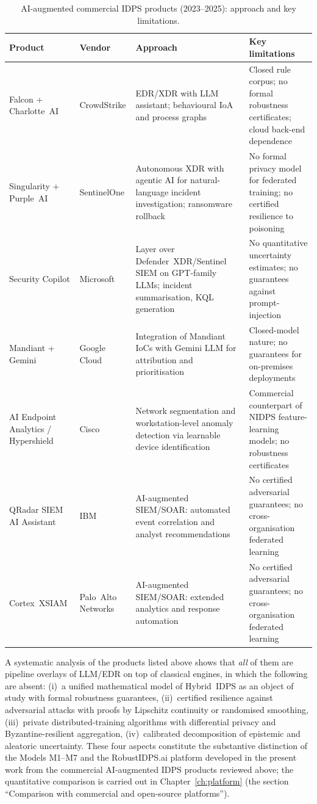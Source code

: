 \fi
\begin{table}[htbp]
\centering
\caption{AI-augmented commercial IDPS products (2023--2025): approach and key limitations.}
\label{tab:ai_idps_products}
\small
\setlength{\tabcolsep}{4pt}
\begin{tabular}{p{2.7cm} p{2.0cm} p{4.5cm} p{4.8cm}}
\toprule
\textbf{Product} & \textbf{Vendor} & \textbf{Approach} & \textbf{Key limitations} \\
\midrule
Falcon + Charlotte~AI & CrowdStrike & EDR/XDR with LLM assistant; behavioural IoA and process graphs & Closed rule corpus; no formal robustness certificates; cloud back-end dependence \\
\addlinespace
Singularity + Purple~AI & SentinelOne & Autonomous XDR with agentic AI for natural-language incident investigation; ransomware rollback & No formal privacy model for federated training; no certified resilience to poisoning \\
\addlinespace
Security Copilot & Microsoft & Layer over Defender~XDR/Sentinel SIEM on GPT-family LLMs; incident summarisation, KQL generation & No quantitative uncertainty estimates; no guarantees against prompt-injection \\
\addlinespace
Mandiant + Gemini & Google Cloud & Integration of Mandiant IoCs with Gemini LLM for attribution and prioritisation & Closed-model nature; no guarantees for on-premises deployments \\
\addlinespace
AI Endpoint Analytics / Hypershield & Cisco & Network segmentation and workstation-level anomaly detection via learnable device identification & Commercial counterpart of NIDPS feature-learning models; no robustness certificates \\
\addlinespace
QRadar SIEM AI Assistant & IBM & AI-augmented SIEM/SOAR: automated event correlation and analyst recommendations & No certified adversarial guarantees; no cross-organisation federated learning \\
\addlinespace
Cortex~XSIAM & Palo~Alto Networks & AI-augmented SIEM/SOAR: extended analytics and response automation & No certified adversarial guarantees; no cross-organisation federated learning \\
\bottomrule
\end{tabular}
\end{table}

\noindent A systematic analysis of the products listed above
shows that \emph{all} of them are pipeline overlays of LLM/EDR
on top of classical engines, in which the following are absent:
(i)~a unified mathematical model of Hybrid~IDPS as an object of
study with formal robustness guarantees, (ii)~certified resilience
against adversarial attacks with proofs by Lipschitz continuity or
randomised smoothing, (iii)~private distributed-training
algorithms with differential privacy and Byzantine-resilient
aggregation, (iv)~calibrated decomposition of epistemic and
aleatoric uncertainty. These four aspects constitute the
substantive distinction of the Models M1--M7 and the RobustIDPS.ai
platform developed in the present work from the commercial
AI-augmented IDPS products reviewed above; the quantitative
comparison is carried out in Chapter~\ref{ch:platform} (the
section ``Comparison with commercial and open-source
platforms'').

